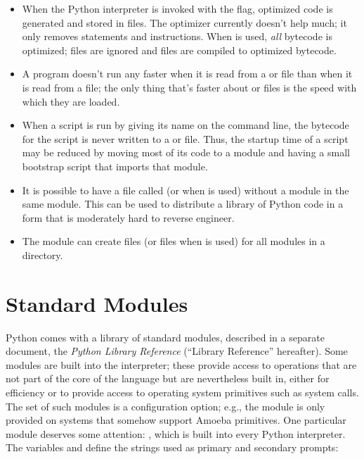 \documentclass{manual}
\begin{document}
\begin{itemize}

\item
When the Python interpreter is invoked with the  flag,
optimized code is generated and stored in  files.
The optimizer currently doesn't help much; it only removes
 statements and  instructions.
When  is used, \emph{all} bytecode is optimized; 
files are ignored and  files are compiled to optimized
bytecode.

\item
A program doesn't run any faster when it is read from a
 or  file than when it is read from a 
file; the only thing that's faster about  or 
files is the speed with which they are loaded.

\item
When a script is run by giving its name on the command line, the
bytecode for the script is never written to a  or
 file.  Thus, the startup time of a script may be reduced
by moving most of its code to a module and having a small bootstrap
script that imports that module.

\item
It is possible to have a file called  (or
 when  is used) without a module
 in the same module.  This can be used to distribute
a library of Python code in a form that is moderately hard to reverse
engineer.

\item
The module  can create
 files (or  files when  is used) for
all modules in a directory.

\end{itemize}


\section{Standard Modules}
\label{standardModules}

Python comes with a library of standard modules, described in a separate
document, the \emph{Python Library Reference} (``Library Reference''
hereafter).  Some modules are built into the interpreter; these
provide access to operations that are not part of the core of the
language but are nevertheless built in, either for efficiency or to
provide access to operating system primitives such as system calls.
The set of such modules is a configuration option; e.g., the
 module is  only provided on systems that somehow
support Amoeba primitives.  One particular module deserves some
attention: , which is built into every
Python interpreter.  The variables  and 
define the strings used as primary and secondary prompts:
\end{document}
